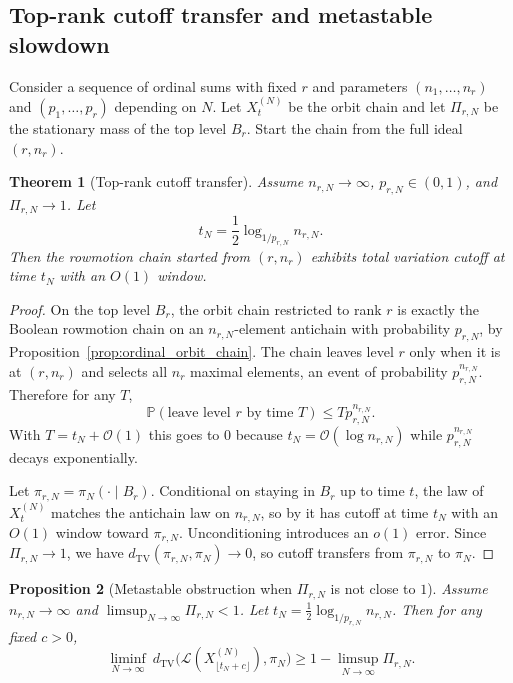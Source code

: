 \documentclass[final,3p,times]{elsarticle}
\newtheorem{theorem}{Theorem}[section]
\newtheorem{proposition}[theorem]{Proposition}
\theoremstyle{definition}
\newcommand{\PP}{\mathbb{P}}
\newcommand{\TV}{d_{\mathrm{TV}}}
\newcommand{\cO}{\mathcal{O}}
\begin{document}
\subsection{Top-rank cutoff transfer and metastable slowdown}

Consider a sequence of ordinal sums with fixed $r$ and parameters $(n_1,\dots,n_r)$ and $(p_1,\dots,p_r)$ depending on $N$.
Let $X^{(N)}_t$ be the orbit chain and let $\Pi_{r,N}$ be the stationary mass of the top level $B_r$.
Start the chain from the full ideal $(r,n_r)$.

\begin{theorem}[Top-rank cutoff transfer]\label{thm:top_rank_transfer}
Assume $n_{r,N}\to\infty$, $p_{r,N}\in(0,1)$, and $\Pi_{r,N}\to 1$.
Let
\[
t_N = \frac12\log_{1/p_{r,N}} n_{r,N}.
\]
Then the rowmotion chain started from $(r,n_r)$ exhibits total variation cutoff at time $t_N$ with an $O(1)$ window.
\end{theorem}

\begin{proof}
On the top level $B_r$, the orbit chain restricted to rank $r$ is exactly the Boolean rowmotion chain on an $n_{r,N}$-element antichain with probability $p_{r,N}$, by Proposition~\ref{prop:ordinal_orbit_chain}.
The chain leaves level $r$ only when it is at $(r,n_r)$ and selects all $n_r$ maximal elements, an event of probability $p_{r,N}^{n_{r,N}}$.
Therefore for any $T$,
\[
\PP(\text{leave level }r\text{ by time }T)\le T p_{r,N}^{n_{r,N}}.
\]
With $T=t_N+\cO(1)$ this goes to $0$ because $t_N=\cO(\log n_{r,N})$ while $p_{r,N}^{n_{r,N}}$ decays exponentially.

Let $\pi_{r,N}=\pi_N(\cdot\mid B_r)$.
Conditional on staying in $B_r$ up to time $t$, the law of $X^{(N)}_t$ matches the antichain law on $n_{r,N}$, so by \cite[Theorem 1.6]{DefantLiNestoridi2024Rowmotion} it has cutoff at time $t_N$ with an $O(1)$ window toward $\pi_{r,N}$.
Unconditioning introduces an $o(1)$ error.
Since $\Pi_{r,N}\to 1$, we have $\TV(\pi_{r,N},\pi_N)\to 0$, so cutoff transfers from $\pi_{r,N}$ to $\pi_N$.
\end{proof}

\begin{proposition}[Metastable obstruction when $\Pi_{r,N}$ is not close to $1$]\label{prop:top_rank_obstruction}
Assume $n_{r,N}\to\infty$ and $\limsup_{N\to\infty}\Pi_{r,N}<1$.
Let $t_N=\frac12\log_{1/p_{r,N}} n_{r,N}$.
Then for any fixed $c>0$,
\[
\liminf_{N\to\infty}\ \TV\bigl(\mathcal{L}(X^{(N)}_{\lfloor t_N+c\rfloor}),\pi_N\bigr)
\ge 1-\limsup_{N\to\infty}\Pi_{r,N}.
\]
\end{proposition}
\end{document}
